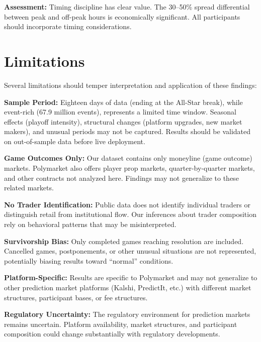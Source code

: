 \textbf{Assessment:} Timing discipline has clear value. The 30--50\% spread differential between peak and off-peak hours is economically significant. All participants should incorporate timing considerations.

\section{Limitations}

Several limitations should temper interpretation and application of these findings:

\textbf{Sample Period:} Eighteen days of data (ending at the All-Star break), while event-rich (67.9 million events), represents a limited time window. Seasonal effects (playoff intensity), structural changes (platform upgrades, new market makers), and unusual periods may not be captured. Results should be validated on out-of-sample data before live deployment.

\textbf{Game Outcomes Only:} Our dataset contains only moneyline (game outcome) markets. Polymarket also offers player prop markets, quarter-by-quarter markets, and other contracts not analyzed here. Findings may not generalize to these related markets.

\textbf{No Trader Identification:} Public data does not identify individual traders or distinguish retail from institutional flow. Our inferences about trader composition rely on behavioral patterns that may be misinterpreted.

\textbf{Survivorship Bias:} Only completed games reaching resolution are included. Cancelled games, postponements, or other unusual situations are not represented, potentially biasing results toward ``normal'' conditions.

\textbf{Platform-Specific:} Results are specific to Polymarket and may not generalize to other prediction market platforms (Kalshi, PredictIt, etc.) with different market structures, participant bases, or fee structures.

\textbf{Regulatory Uncertainty:} The regulatory environment for prediction markets remains uncertain. Platform availability, market structures, and participant composition could change substantially with regulatory developments.

